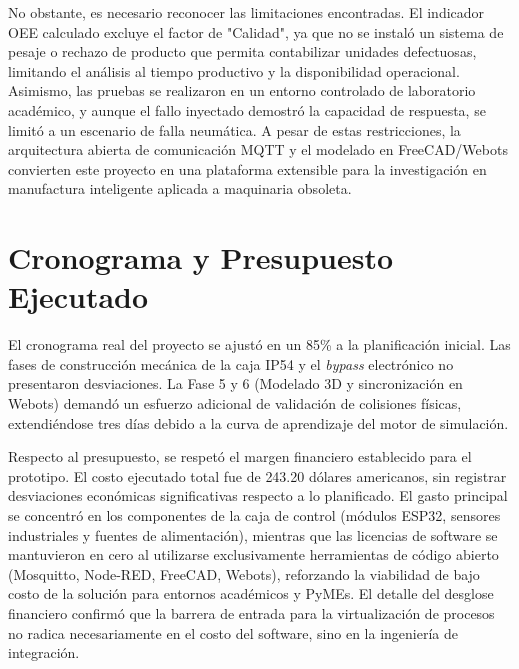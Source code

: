 No obstante, es necesario reconocer las limitaciones encontradas. El indicador OEE calculado excluye el factor de "Calidad", ya que no se instaló un sistema de pesaje o rechazo de producto que permita contabilizar unidades defectuosas, limitando el análisis al tiempo productivo y la disponibilidad operacional. Asimismo, las pruebas se realizaron en un entorno controlado de laboratorio académico, y aunque el fallo inyectado demostró la capacidad de respuesta, se limitó a un escenario de falla neumática. A pesar de estas restricciones, la arquitectura abierta de comunicación MQTT y el modelado en FreeCAD/Webots convierten este proyecto en una plataforma extensible para la investigación en manufactura inteligente aplicada a maquinaria obsoleta.

\section{Cronograma y Presupuesto Ejecutado}

El cronograma real del proyecto se ajustó en un 85\% a la planificación inicial. Las fases de construcción mecánica de la caja IP54 y el \textit{bypass} electrónico no presentaron desviaciones. La Fase 5 y 6 (Modelado 3D y sincronización en Webots) demandó un esfuerzo adicional de validación de colisiones físicas, extendiéndose tres días debido a la curva de aprendizaje del motor de simulación.

Respecto al presupuesto, se respetó el margen financiero establecido para el prototipo. El costo ejecutado total fue de 243.20 dólares americanos, sin registrar desviaciones económicas significativas respecto a lo planificado. El gasto principal se concentró en los componentes de la caja de control (módulos ESP32, sensores industriales y fuentes de alimentación), mientras que las licencias de software se mantuvieron en cero al utilizarse exclusivamente herramientas de código abierto (Mosquitto, Node-RED, FreeCAD, Webots), reforzando la viabilidad de bajo costo de la solución para entornos académicos y PyMEs. El detalle del desglose financiero confirmó que la barrera de entrada para la virtualización de procesos no radica necesariamente en el costo del software, sino en la ingeniería de integración.

